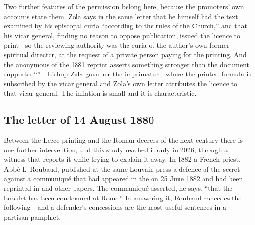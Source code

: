 Two further features of the permission belong here, because the
promoters' own accounts state them. Zola says in the same letter
that he himself had the text examined by his episcopal curia
``according to the rules of the Church,'' and that his vicar
general, finding no reason to oppose publication, issued the licence
to print---so the reviewing authority was the curia of the author's
own former spiritual director, at the request of a private person
paying for the printing. And the anonymous  of
the 1881 reprint asserts something stronger than the document
supports: ``''---Bishop Zola gave her the imprimatur---where the
printed formula is subscribed by the vicar general and Zola's own
letter attributes the licence to that vicar general. The inflation
is small and it is characteristic.

\subsection{The letter of 14 August 1880}

Between the Lecce printing and the Roman decrees of the next century
there is one further intervention, and this study reached it only in
2026, through a witness that reports it while trying to explain it
away. In 1882 a French priest, Abbé I.~Roubaud, published at the
same Louvain press a defence of the secret against a communiqué that
had appeared in the  on 25 June
1882 and had been reprinted in  and other papers. The
communiqué asserted, he says, ``that the booklet has been condemned
at Rome.'' In answering it, Roubaud concedes the following---and a
defender's concessions are the most useful sentences in a partisan
pamphlet.

